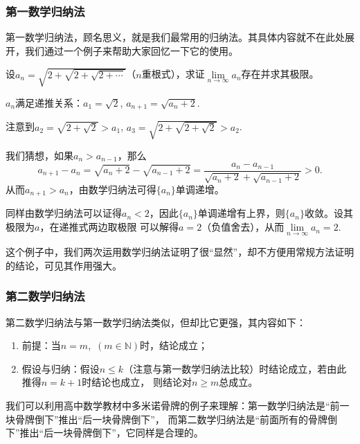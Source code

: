 \subsubsection{第一数学归纳法}
第一数学归纳法，顾名思义，就是我们最常用的归纳法。其具体内容就不在此处展开，我们通过一个例子来帮助大家回忆一下它的使用。
\begin{example}
    设$a_n=\sqrt{2+\sqrt{2+\sqrt{2+\cdots}}}$（$n$重根式），求证$\lim\limits_{n \to \infty}a_n$存在并求其极限。
\end{example}
\begin{solve}
    $a_n$满足递推关系：$a_1=\sqrt{2}$, $a_{n+1}=\sqrt{a_n+2}$.

    注意到$a_2=\sqrt{2+\sqrt{2}}>a_1$, $a_3=\sqrt{2+\sqrt{2+\sqrt{2}}}>a_2$.

    我们猜想，如果$a_n>a_{n-1}$，那么
    \[
        a_{n+1}-a_n=\sqrt{a_n+2}-\sqrt{a_{n-1}+2}=
        \frac{a_n-a_{n-1}}{\sqrt{a_n+2}+\sqrt{a_{n-1}+2}}>0
        .\]
    从而$a_{n+1}>a_n$，由数学归纳法可得$\{ a_n\}$单调递增。


    同样由数学归纳法可以证得$a_n<2$，因此$\{ a_n\}$单调递增有上界，则$\{ a_n\}$收敛。设其极限为$a$，在递推式两边取极限
    可以解得$a=2$（负值舍去），从而$\lim\limits_{n \to \infty}a_n=2$.
\end{solve}
这个例子中，我们两次运用数学归纳法证明了很“显然”，却不方便用常规方法证明的结论，可见其作用强大。
\subsubsection{第二数学归纳法}
第二数学归纳法与第一数学归纳法类似，但却比它更强，其内容如下：

\begin{enumerate}
    \item 前提：当$n=m$,~$(m \in \mathbb{N})$时，结论成立；
    \item 假设与归纳：假设$n\leqslant k$（注意与第一数学归纳法比较）时结论成立，若由此推得$n=k+1$时结论也成立，
          则结论对$n \geqslant m$总成立。

\end{enumerate}

我们可以利用高中数学教材中多米诺骨牌的例子来理解：第一数学归纳法是“前一块骨牌倒下”推出“后一块骨牌倒下”，
而第二数学归纳法是“前面所有的骨牌倒下”推出“后一块骨牌倒下”，它同样是合理的。


